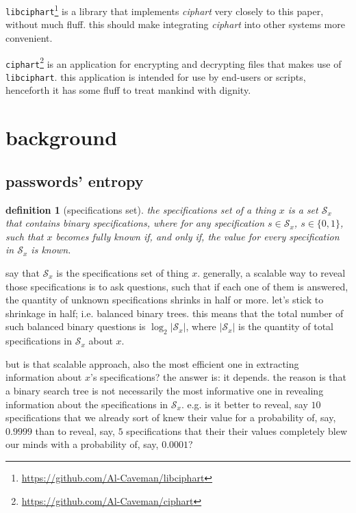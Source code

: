 \documentclass[twocolumn]{article}
\newtheorem{definition}{definition}
\begin{document}
\texttt{libciphart}\footnote{\url{https://github.com/Al-Caveman/libciphart}}
is a library that implements \emph{ciphart} very closely to this paper,
without much fluff.  this should make integrating \emph{ciphart} into other
systems more convenient.

\texttt{ciphart}\footnote{\url{https://github.com/Al-Caveman/ciphart}} is
an application for encrypting and decrypting files that makes use of
\texttt{libciphart}.  this application is intended for use by end-users or
scripts, henceforth it has some fluff to treat mankind with dignity.

\break
\tableofcontents

\section{background}
\subsection{passwords' entropy}
\begin{definition}[specifications set]
    the specifications set of a thing $x$ is a set $\mathcal{S}_x$ that
    contains binary specifications, where for any specification $s \in
    \mathcal{S}_x$, $s \in \{0,1\}$, such that $x$ becomes fully known if,
    and only if, the value for every specification in $\mathcal{S}_x$ is
    known.
\end{definition}

say that $\mathcal{S}_x$ is the specifications set of thing $x$.  generally,
a scalable way to reveal those specifications is to ask questions, such
that if each one of them is answered, the quantity of unknown
specifications shrinks in half or more.  let's stick to shrinkage in half;
i.e. balanced binary trees.  this means that the total number of such
balanced binary questions is $\log_2 |\mathcal{S}_x|$, where $|\mathcal{S}_x|$
is the quantity of total specifications in $\mathcal{S}_x$ about $x$.

but is that scalable approach, also the most efficient one in extracting
information about $x$'s specifications?  the answer is: it depends.  the
reason is that a binary search tree is not necessarily the most informative
one in revealing information about the specifications in $\mathcal{S}_x$.
e.g. is it better to reveal, say $10$ specifications that we already sort
of knew their value for a probability of, say, $0.9999$ than to reveal,
say, $5$ specifications that their their values completely blew our minds
with a probability of, say, $0.0001$?
\end{document}
